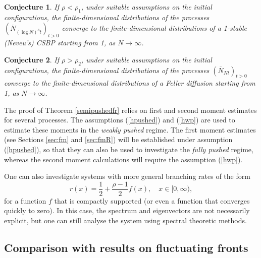 \documentclass[11pt]{article}
\theoremstyle{plain}
\newtheorem{conj}{Conjecture}
\begin{document}
\begin{conj} If $\rho<\rho_1$, under suitable assumptions on the initial configurations, the finite-dimensional distributions of the processes $(\overline N_{(\log N)^3t})_{t>0}$ converge to the finite-dimensional distributions of a 1-stable (Neveu's) CSBP starting from 1, as $N\to \infty$.
\end{conj}
\begin{conj}If $\rho > \rho_2$,  under suitable assumptions on the initial configurations, the finite-dimensional distributions of the processes $(\overline N_{Nt})_{t>0}$ converge  to the finite-dimensional distributions of a Feller diffusion starting from 1, as $N\to \infty$.
\end{conj}

The proof of Theorem \ref{semipushedfr} relies on  first and  second moment estimates for several processes. The assumptions (\ref{hpushed}) and (\ref{hwp}) are used to estimate these moments in the \textit{weakly pushed} regime. The first moment estimates (see Sections \ref{sec:fm} and \ref{sec:fmR}) will be established under assumption (\ref{hpushed}), so that they can also be used to investigate the \textit{fully pushed} regime, whereas the second moment calculations will  require the assumption (\ref{hwp}).

One can also investigate systems with more general branching rates of the form
\begin{equation*}
r(x)=\frac{1}{2}+\frac{\rho-1}{2}f(x), \quad x\in[0,\infty),
\end{equation*}
for a function $f$ that is compactly supported (or even a function that converges quickly  to zero). In this case, the spectrum and eigenvectors are not necessarily explicit, but one can still analyse the system using spectral theoretic methods.


\subsection{Comparison with results on fluctuating fronts}
\end{document}
